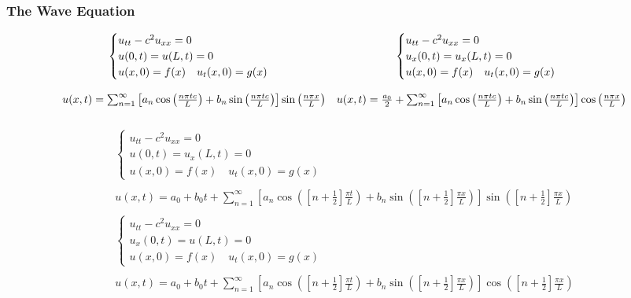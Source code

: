 \documentclass{article}
\begin{document}
\subsubsection{The Wave Equation}
\[
\begin{array}{c c}
\begin{cases}
u_{tt} - c^{2}u_{xx} = 0\\
u(0,t) = u(L,t) = 0\\
u(x,0) = f(x) \quad u_{t}(x,0) = g(x)
\end{cases}
&
\begin{cases}
u_{tt} - c^{2}u_{xx} = 0\\
u_{x}(0,t) = u_{x}(L,t) = 0\\
u(x,0) = f(x) \quad u_{t}(x,0) = g(x)
\end{cases}\\
&\\
u(x,t) = \sum_{n=1}^{\infty}\left[a_{n}\cos{\left(\frac{n \pi t c}{L}\right)} + b_{n}\sin{\left(\frac{n \pi t c}{L}\right)}\right]\sin{\left(\frac{n \pi x}{L}\right)}
&u(x,t) = \frac{a_{0}}{2} + \sum_{n=1}^{\infty}\left[a_{n}\cos{\left(\frac{n \pi t c}{L}\right)} + b_{n}\sin{\left(\frac{n \pi t c}{L}\right)}\right]\cos{\left(\frac{n \pi x}{L}\right)}\\
&\\
\end{array}
\]
\[
\begin{array}{c}
\begin{cases}
u_{tt} - c^{2}u_{xx} = 0\\
u(0,t) = u_{x}(L,t) = 0\\
u(x,0) = f(x) \quad u_{t}(x,0) = g(x)
\end{cases}\\
\\
u(x,t) = a_{0} + b_{0}t + \sum_{n=1}^{\infty}\left[ a_{n}\cos{\left(\left[n + \frac{1}{2}\right]\frac{\pi t}{L}\right)} + b_{n}\sin{\left(\left[n + \frac{1}{2}\right]\frac{\pi x}{L}\right)}\right]\sin{\left(\left[n + \frac{1}{2}\right]\frac{\pi x}{L}\right)}\\
\\
\begin{cases}
u_{tt} - c^{2}u_{xx} = 0\\
u_{x}(0,t) = u(L,t) = 0\\
u(x,0) = f(x) \quad u_{t}(x,0) = g(x)
\end{cases}\\
\\
u (x,t) = a_{0} + b_{0}t + \sum_{n=1}^{\infty}\left[ a_{n}\cos{\left(\left[n + \frac{1}{2}\right]\frac{\pi t}{L}\right)} + b_{n}\sin{\left(\left[n + \frac{1}{2}\right]\frac{\pi x}{L}\right)}\right]\cos{\left(\left[n + \frac{1}{2}\right]\frac{\pi x}{L}\right)}
\end{array}
\]
\end{document}
